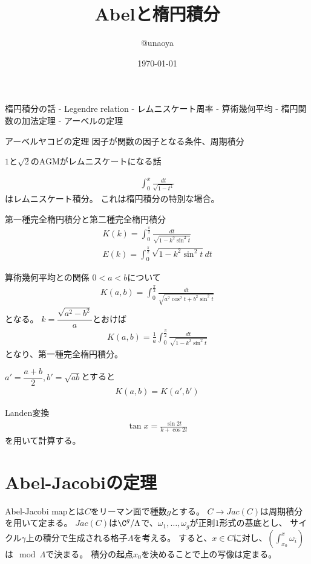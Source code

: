 \documentclass{jsarticle}
\title{Abelと楕円積分}
\author{@unaoya}
\date{\today}
\begin{document}
\maketitle
楕円積分の話
- Legendre relation
- レムニスケート周率
- 算術幾何平均
- 楕円関数の加法定理
- アーベルの定理

アーベルヤコビの定理
因子が関数の因子となる条件、周期積分

$1$と$\sqrt{2}$のAGMがレムニスケートになる話

\begin{align*}
\int^x_0\frac{dt}{\sqrt{1-t^4}}
\end{align*}
はレムニスケート積分。
これは楕円積分の特別な場合。

第一種完全楕円積分と第二種完全楕円積分
\begin{align*}
K(k)=\int^{\frac{\pi}{2}}_0\frac{dt}{\sqrt{1-k^2\sin^2t}}\\
E(k)=\int^{\frac{\pi}{2}}_0\sqrt{1-k^2\sin^2t}dt
\end{align*}

算術幾何平均との関係
$0<a<b$について
\begin{align*}
K(a,b)=\int^{\frac{\pi}{2}}_0\frac{dt}{\sqrt{a^2\cos^2t+b^2\sin^2t}}
\end{align*}
となる。
$k=\dfrac{\sqrt{a^2-b^2}}{a}$とおけば
\begin{align*}
K(a,b)=\frac{1}{a}\int^{\frac{\pi}{2}}_0\frac{dt}{\sqrt{1-k^2\sin^2t}}
\end{align*}
となり、第一種完全楕円積分。

\begin{thm}
$a'=\dfrac{a+b}{2}, b'=\sqrt{ab}$とすると
\begin{align*}
K(a,b)=K(a',b')
\end{align*}
\end{thm}
Landen変換
\begin{align*}
\tan x=\frac{\sin2t}{k+\cos2t}
\end{align*}
を用いて計算する。

\section{Abel-Jacobiの定理}
Abel-Jacobi mapとは$C$をリーマン面で種数$g$とする。
$C \to Jac(C)$は周期積分を用いて定まる。
$Jac(C)$は$\C^g/\Lambda$で、$\omega_1,\ldots,\omega_g$が正則$1$形式の基底とし、
サイクル$\gamma$上の積分で生成される格子$\Lambda$を考える。
すると、$x\in C$に対し、$(\int_{x_0}^x\omega_i)$は$\mod \Lambda$で決まる。
積分の起点$x_0$を決めることで上の写像は定まる。
\end{document}
